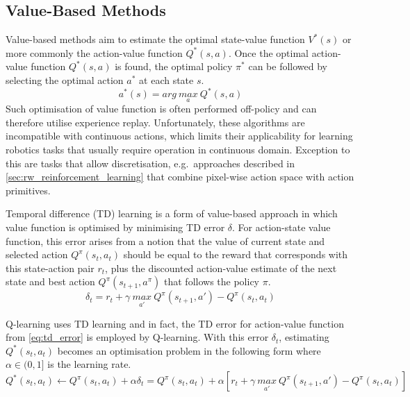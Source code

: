 \subsection{Value-Based Methods}

Value-based methods aim to estimate the optimal state-value function \(V^{*}(s)\) or more commonly the action-value function \(Q^{*}(s, a)\). Once the optimal action-value function \(Q^{*}(s, a)\) is found, the optimal policy \(\pi^{*}\) can be followed by selecting the optimal action \(a^{*}\) at each state \(s\).
\begin{equation}
    a^{*}(s) = arg\ \underset{a}{max}\ Q^{*}(s, a)
\end{equation}
Such optimisation of value function is often performed off-policy and can therefore utilise experience replay. Unfortunately, these algorithms are incompatible with continuous actions, which limits their applicability for learning robotics tasks that usually require operation in continuous domain. Exception to this are tasks that allow discretisation, e.g.~approaches described in \autoref{sec:rw_reinforcement_learning} that combine pixel-wise action space with action primitives.

Temporal difference (TD) learning is a form of value-based approach in which value function is optimised by minimising TD error \(\delta\). For action-state value function, this error arises from a notion that the value of current state and selected action \(Q^{\pi}(s_{t}, a_{t})\) should be equal to the reward that corresponds with this state-action pair \(r_{t}\), plus the discounted action-value estimate of the next state and best action \(Q^{\pi}(s_{t+1}, a^{\pi})\) that follows the policy \(\pi\).
\begin{equation}
    \delta_{t} = r_{t} + \gamma\ \underset{a'}{max}\ Q^{\pi}(s_{t+1}, a') - Q^{\pi}(s_{t}, a_{t})
    \label{eq:td_error}
\end{equation}

Q-learning uses TD learning and in fact, the TD error for action-value function from \autoref{eq:td_error} is employed by Q-learning. With this error \(\delta_{t}\), estimating \(Q^{*}(s_{t}, a_{t})\) becomes an optimisation problem in the following form where \(\alpha \in (0, 1]\) is the learning rate.
\begin{equation}
    Q^{*}(s_{t}, a_{t}) \leftarrow Q^{\pi}(s_{t}, a_{t}) + \alpha\delta_{t} = Q^{\pi}(s_{t}, a_{t}) + \alpha \left[ r_{t} + \gamma\ \underset{a'}{max}\ Q^{\pi}(s_{t+1}, a') - Q^{\pi}(s_{t}, a_{t}) \right]
\end{equation}

